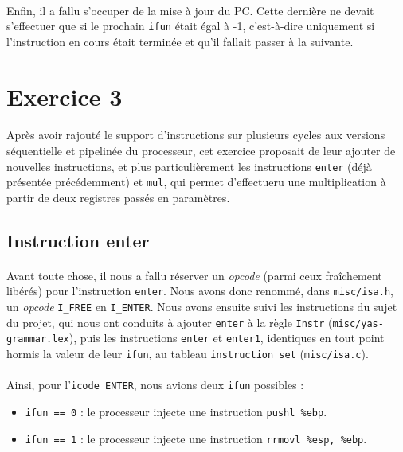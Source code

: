 \documentclass[12pt]{article}
\begin{document}
\paragraph{}Enfin, il a fallu s'occuper de la mise à jour du PC. Cette dernière ne devait s'effectuer que si le prochain \verb+ifun+ était égal à -1, c'est-à-dire uniquement si l'instruction en cours était terminée et qu'il fallait passer à la suivante. 


\section{Exercice 3}
\paragraph{}Après avoir rajouté le support d'instructions sur plusieurs cycles aux versions séquentielle et pipelinée du processeur, cet exercice proposait de leur ajouter de nouvelles instructions, et plus particulièrement les instructions \verb+enter+ (déjà présentée précédemment) et \verb+mul+, qui permet d'effectueru une multiplication à partir de deux registres passés en paramètres.

\subsection{Instruction enter}
\paragraph{}Avant toute chose, il nous a fallu réserver un {\itshape opcode} (parmi ceux fraîchement libérés) pour l'instruction \verb+enter+. Nous avons donc renommé, dans \verb+misc/isa.h+, un {\itshape opcode} \verb+I_FREE+ en \verb+I_ENTER+. Nous avons ensuite suivi les instructions du sujet du projet, qui nous ont conduits à ajouter \verb+enter+ à la règle \verb+Instr+ (\verb+misc/yas-grammar.lex+), puis les instructions \verb+enter+ et \verb+enter1+, identiques en tout point hormis la valeur de leur \verb+ifun+, au tableau \verb+instruction_set+ (\verb+misc/isa.c+).

\paragraph{}Ainsi, pour l'\verb+icode ENTER+, nous avions deux \verb+ifun+ possibles :
\begin{itemize}
\item \verb+ifun == 0+ : le processeur injecte une instruction \verb+pushl %ebp+.
  \item \verb+ifun == 1+ : le processeur injecte une instruction \verb+rrmovl %esp, %ebp+.
\end{itemize}
\end{document}
